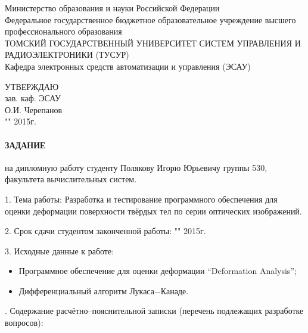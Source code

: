 \newpage
{}

\begin{center}
 Министерство образования и науки Российской Федерации\\
 Федеральное государственное бюджетное образовательное учреждение высшего профессионального образования\\
 ТОМСКИЙ ГОСУДАРСТВЕННЫЙ УНИВЕРСИТЕТ СИСТЕМ УПРАВЛЕНИЯ И РАДИОЭЛЕКТРОНИКИ (ТУСУР)\\
 Кафедра электронных средств автоматизации и управления (ЭСАУ)\\
\end{center}

\begin{flushright}
 \begin{minipage}{0.4\textwidth}
  УТВЕРЖДАЮ \\
  зав. каф. ЭСАУ \\
  \underline{\hspace{2.5cm}}О.И. Черепанов \\
  "\underline{\hspace{1cm}}"\underline{\hspace{3cm}} 2015г.
 \end{minipage}
\end{flushright}


\paragraph*{\hfill ЗАДАНИЕ \hfill}

на дипломную работу студенту Полякову Игорю Юрьевичу группы 530, факультета вычислительных систем.

1. Тема работы: Разработка и тестирование программного обеспечения для оценки деформации поверхности твёрдых тел по серии оптических изображений.

2. Срок сдачи студентом законченной работы: "\underline{\hspace{1cm}}"\underline{\hspace{3cm}} 2015г.

3. Исходные данные к работе:

\begin{itemize}
 \item Программное обеспечение для оценки деформации ``Deformation Analysis'';
 \item Дифференциальный алгоритм Лукаса−Канаде.
\end{itemize}
. Содержание расчётно--пояснительной записки (перечень подлежащих разработке вопросов):

